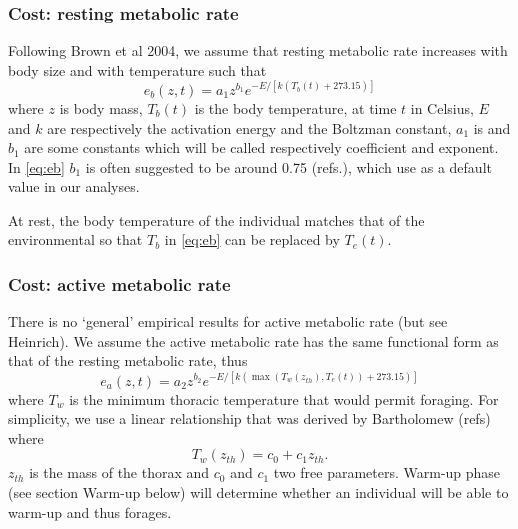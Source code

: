\subsubsection*{Cost: resting metabolic rate}
Following Brown et al 2004, we assume that resting metabolic rate increases with body size and with temperature such that
\begin{equation} \label{eq:eb}
	e_b(z, t) = a_1 z^{b_1} e^{-E/[k (T_b(t)+ 273.15)]}
\end{equation}
where $z$ is body mass, $T_b(t)$ is the body temperature, at time $t$ in Celsius, $E$ and $k$ are respectively the activation energy and the Boltzman constant, $a_1$ is and $b_1$ are some constants which will be called respectively coefficient and exponent.
In \cref{eq:eb} $b_1$ is often suggested to be around 0.75 (refs.), which use as a default value in our analyses.

At rest, the body temperature of the individual matches that of the environmental \citep[e.g.,][]{Bartholomew1978} so that $T_b$ in \cref{eq:eb} can be replaced by $T_e(t)$.

\subsubsection*{Cost: active metabolic rate}
There is no `general' empirical results for active metabolic rate (but see Heinrich).
We assume the active metabolic rate has the same functional form as that of the resting metabolic rate, thus
\begin{equation} \label{eq:ea}
	e_a(z,t) = a_2 z^{b_2}  e^{-E/[k (\max(T_w(z_{th}), T_e(t))+ 273.15)]}
\end{equation}
where $T_w$ is the minimum thoracic temperature that would permit foraging.
For simplicity, we use a linear relationship that was derived by Bartholomew (refs) where
\begin{equation} \label{eq:Tw}
	T_w(z_{th}) = c_0+ c_1 z_{th}.
\end{equation}
$z_{th}$ is the mass of the thorax and $c_0$ and $c_1$ two free parameters.
Warm-up phase (see section Warm-up below) will determine whether an individual will be able to warm-up and thus forages.

